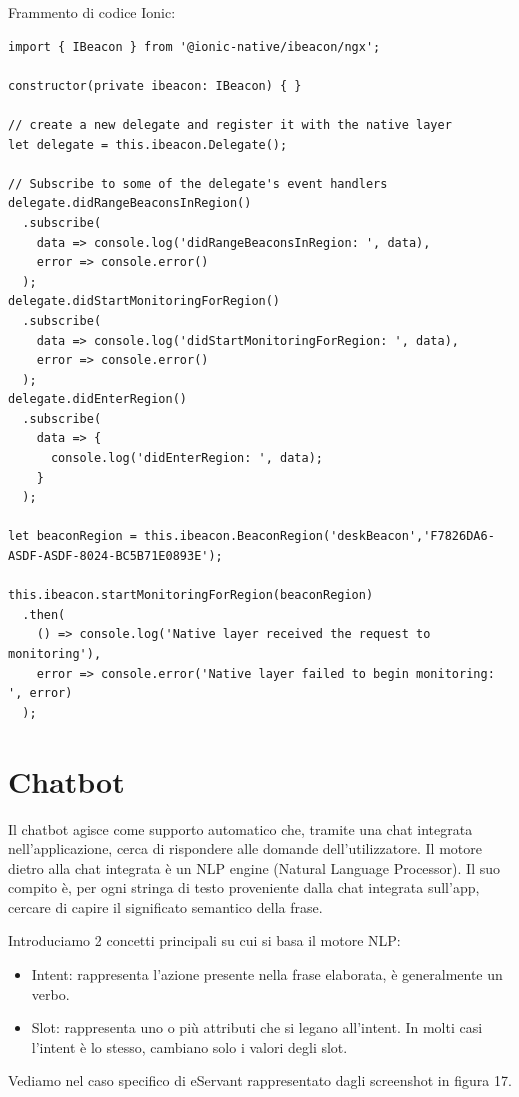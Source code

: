 Frammento di codice Ionic:
\begin{lstlisting}
import { IBeacon } from '@ionic-native/ibeacon/ngx';

constructor(private ibeacon: IBeacon) { }

// create a new delegate and register it with the native layer
let delegate = this.ibeacon.Delegate();

// Subscribe to some of the delegate's event handlers
delegate.didRangeBeaconsInRegion()
  .subscribe(
    data => console.log('didRangeBeaconsInRegion: ', data),
    error => console.error()
  );
delegate.didStartMonitoringForRegion()
  .subscribe(
    data => console.log('didStartMonitoringForRegion: ', data),
    error => console.error()
  );
delegate.didEnterRegion()
  .subscribe(
    data => {
      console.log('didEnterRegion: ', data);
    }
  );

let beaconRegion = this.ibeacon.BeaconRegion('deskBeacon','F7826DA6-ASDF-ASDF-8024-BC5B71E0893E');

this.ibeacon.startMonitoringForRegion(beaconRegion)
  .then(
    () => console.log('Native layer received the request to monitoring'),
    error => console.error('Native layer failed to begin monitoring: ', error)
  );
\end{lstlisting}

\section{Chatbot}

Il chatbot agisce come supporto automatico che, tramite una chat integrata nell'applicazione, cerca di rispondere
alle domande dell'utilizzatore.
Il motore dietro alla chat integrata è un NLP engine (Natural Language Processor).
Il suo compito è, per ogni stringa di testo proveniente dalla chat integrata sull'app, cercare di capire
il significato semantico della frase.

Introduciamo 2 concetti principali su cui si basa il motore NLP:

\begin{itemize}
\item Intent: rappresenta l'azione presente nella frase elaborata, è generalmente un verbo.
\item Slot: rappresenta uno o più attributi che si legano all'intent. In molti casi l'intent è lo stesso,
cambiano solo i valori degli slot.
\end{itemize}

Vediamo nel caso specifico di eServant rappresentato dagli screenshot in figura 17.

